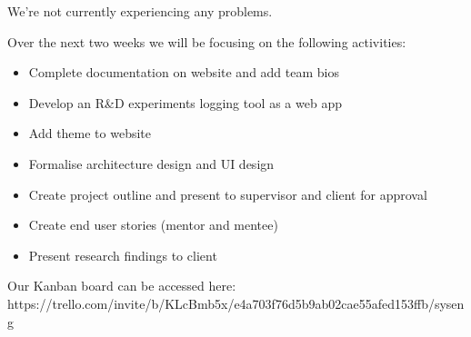 \documentclass[11pt]{report}
\begin{document}
\bigskip
{}
\smallskip

\noindent
We're not currently experiencing any problems.\\

\bigskip
{}
\smallskip

\noindent
Over the next two weeks we will be focusing on the following activities:

\begin{itemize}
  \item Complete documentation on website and add team bios
  \item Develop an R\&D experiments logging tool as a web app
  \item Add theme to website
  \item Formalise architecture design and UI design
  \item Create project outline and present to supervisor and client for approval
  \item Create end user stories (mentor and mentee)
  \item Present research findings to client
\end{itemize}

\noindent
Our Kanban board can be accessed here:\\
https://trello.com/invite/b/KLcBmb5x/e4a703f76d5b9ab02cae55afed153ffb/syseng
\end{document}
